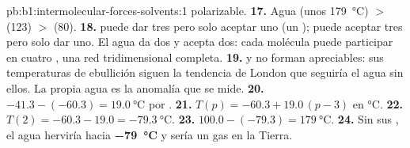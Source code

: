 \begin{solution}{pb:b1:intermolecular-forces-solvents:1}
polarizable.
\textbf{17.} Agua (unos \qty{179}{\celsius}) $>$  (123) $>$
 (80).
\textbf{18.}  puede dar tres pero solo aceptar uno (un );  puede aceptar tres pero solo dar uno. El agua da dos
y acepta dos: cada molécula puede participar en cuatro , una red tridimensional completa.
\textbf{19.}  y  no forman 
apreciables: sus temperaturas de ebullición siguen la tendencia de London
que seguiría el agua sin ellos. La propia agua es la anomalía que se
mide.
\textbf{20.} $-41.3 - (-60.3) = \qty{19.0}{\celsius}$ por .
\textbf{21.} $T(p) = -60.3 + 19.0\,(p - 3)$ en \unit{\celsius}.
\textbf{22.} $T(2) = -60.3 - 19.0 = \qty{-79.3}{\celsius}$.
\textbf{23.} $100.0 - (-79.3) = \qty{179}{\celsius}$.
\textbf{24.} Sin sus , el agua herviría hacia
\textbf{\qty{-79}{\celsius}} y sería un gas en la Tierra.
\end{solution}
